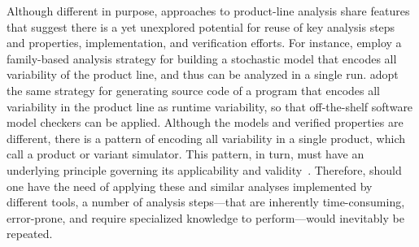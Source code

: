 Although different in purpose,  approaches to product-line analysis share features that suggest there is a yet unexplored potential for reuse of key analysis steps and properties, implementation, and verification efforts. 
For instance, \citet{kowal_scaling_2015} employ a family-based analysis strategy for building a stochastic model that encodes all variability of the product line, and thus can be analyzed in a single run.
\citet{ApelSimulator} adopt the same strategy for generating source code of a program that encodes all variability in the product line as runtime variability, so that off-the-shelf software model checkers
can be applied. Although the models and verified properties are different, there
 is a pattern of encoding all variability in a single product, which \citet{ApelSimulator} call a product or variant simulator. This pattern, in turn, must have an underlying principle governing its
applicability and validity~\cite{variationalDataStructure}.
Therefore, should one have the need of applying these and similar analyses implemented by different tools, a number of analysis steps---that are inherently time-consuming, error-prone, and require specialized knowledge to perform---would inevitably be repeated. 



